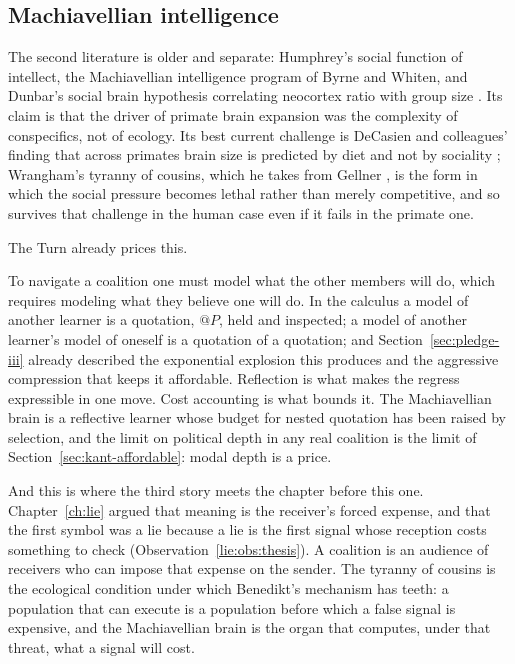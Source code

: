 \subsection{Machiavellian intelligence}

The second literature is older and separate: Humphrey's social function of intellect, the Machiavellian intelligence program of Byrne and Whiten, and Dunbar's social brain hypothesis correlating neocortex ratio with group size \cite{humphrey1976,byrne1988,dunbar1998}. Its claim is that the driver of primate brain expansion was the complexity of conspecifics, not of ecology. Its best current challenge is DeCasien and colleagues' finding that across primates brain size is predicted by diet and not by sociality \cite{decasien2017}; Wrangham's tyranny of cousins, which he takes from Gellner \cite{gellner1988}, is the form in which the social pressure becomes lethal rather than merely competitive, and so survives that challenge in the human case even if it fails in the primate one.

The Turn already prices this.

\begin{remark}
\label{st:rem:machiavelli}
To navigate a coalition one must model what the other members will do, which requires modeling what they believe one will do. In the calculus a model of another learner is a quotation, $@P$, held and inspected; a model of another learner's model of oneself is a quotation of a quotation; and Section~\ref{sec:pledge-iii} already described the exponential explosion this produces and the aggressive compression that keeps it affordable. Reflection is what makes the regress expressible in one move. Cost accounting is what bounds it. The Machiavellian brain is a reflective learner whose budget for nested quotation has been raised by selection, and the limit on political depth in any real coalition is the limit of Section~\ref{sec:kant-affordable}: modal depth is a price.
\end{remark}

\noindent
And this is where the third story meets the chapter before this one. Chapter~\ref{ch:lie} argued that meaning is the receiver's forced expense, and that the first symbol was a lie because a lie is the first signal whose reception costs something to check (Observation~\ref{lie:obs:thesis}). A coalition is an audience of receivers who can impose that expense on the sender. The tyranny of cousins is the ecological condition under which Benedikt's mechanism has teeth: a population that can execute is a population before which a false signal is expensive, and the Machiavellian brain is the organ that computes, under that threat, what a signal will cost.

